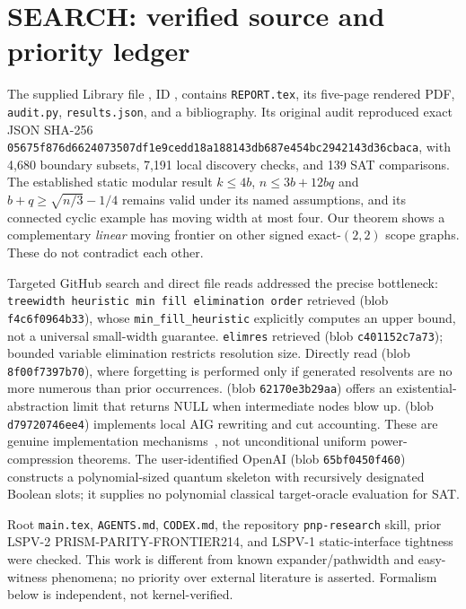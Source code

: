 \documentclass[11pt]{article}
\begin{document}
\section{SEARCH: verified source and priority ledger}
The supplied Library file , ID , contains \texttt{REPORT.tex}, its five-page rendered PDF, \texttt{audit.py}, \texttt{results.json}, and a bibliography. Its original audit reproduced exact JSON SHA-256 \texttt{05675f876d6624073507df1e9cedd18a188143db687e454bc2942143d36cbaca}, with 4,680 boundary subsets, 7,191 local discovery checks, and 139 SAT comparisons. The established static modular result $k\le4b$, $n\le3b+12bq$ and $b+q\ge\sqrt{n/3}-1/4$ remains valid under its named assumptions, and its connected cyclic example has moving width at most four. Our theorem shows a complementary \emph{linear} moving frontier on other signed exact-$(2,2)$ scope graphs. These do not contradict each other.

Targeted GitHub search and direct file reads addressed the precise bottleneck: \texttt{treewidth heuristic min fill elimination order} retrieved  (blob \texttt{f4c6f0964b33}), whose \texttt{min\_fill\_heuristic} explicitly computes an upper bound, not a universal small-width guarantee. \texttt{elimres} retrieved  (blob \texttt{c401152c7a73}); bounded variable elimination restricts resolution size. Directly read  (blob \texttt{8f00f7397b70}), where forgetting is performed only if generated resolvents are no more numerous than prior occurrences.  (blob \texttt{62170e3b29aa}) offers an existential-abstraction limit that returns NULL when intermediate nodes blow up.  (blob \texttt{d79720746ee4}) implements local AIG rewriting and cut accounting. These are genuine implementation mechanisms~\cite{cadical,d4,cudd,abc,dwave}, not unconditional uniform power-compression theorems. The user-identified OpenAI  (blob \texttt{65bf0450f460}) constructs a polynomial-sized quantum skeleton with recursively designated Boolean slots; it supplies no polynomial classical target-oracle evaluation for SAT.

Root \texttt{main.tex}, \texttt{AGENTS.md}, \texttt{CODEX.md}, the repository \texttt{pnp-research} skill, prior LSPV-2 PRISM-PARITY-FRONTIER214, and LSPV-1 static-interface tightness were checked. This work is different from known expander/pathwidth and easy-witness phenomena; no priority over external literature is asserted. Formalism below is independent, not kernel-verified.
\end{document}
